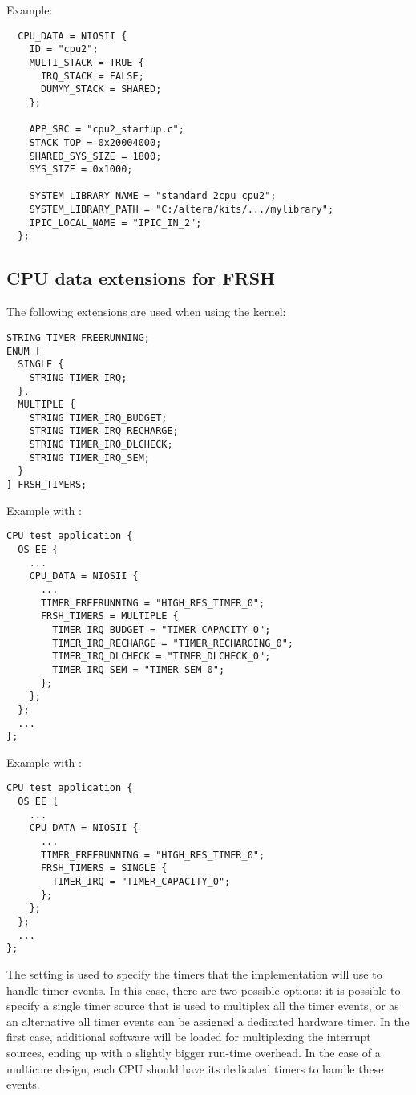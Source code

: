Example:

\begin{lstlisting}
  CPU_DATA = NIOSII {
    ID = "cpu2";
    MULTI_STACK = TRUE {
      IRQ_STACK = FALSE;
      DUMMY_STACK = SHARED;
    };

    APP_SRC = "cpu2_startup.c";
    STACK_TOP = 0x20004000;
    SHARED_SYS_SIZE = 1800;
    SYS_SIZE = 0x1000; 

    SYSTEM_LIBRARY_NAME = "standard_2cpu_cpu2";
    SYSTEM_LIBRARY_PATH = "C:/altera/kits/.../mylibrary";
    IPIC_LOCAL_NAME = "IPIC_IN_2";
  };
\end{lstlisting}

\subsection{CPU data extensions for FRSH}

The following extensions are used when using the  kernel:

\begin{lstlisting}
STRING TIMER_FREERUNNING;
ENUM [
  SINGLE {
    STRING TIMER_IRQ;
  },
  MULTIPLE {
    STRING TIMER_IRQ_BUDGET;
    STRING TIMER_IRQ_RECHARGE;
    STRING TIMER_IRQ_DLCHECK;
    STRING TIMER_IRQ_SEM;
  }
] FRSH_TIMERS;
\end{lstlisting}

Example with :

\begin{lstlisting}
CPU test_application {
  OS EE {
    ...
    CPU_DATA = NIOSII {
      ...
      TIMER_FREERUNNING = "HIGH_RES_TIMER_0";
      FRSH_TIMERS = MULTIPLE {
        TIMER_IRQ_BUDGET = "TIMER_CAPACITY_0";
        TIMER_IRQ_RECHARGE = "TIMER_RECHARGING_0";
        TIMER_IRQ_DLCHECK = "TIMER_DLCHECK_0";
        TIMER_IRQ_SEM = "TIMER_SEM_0";
      };
    };
  };
  ...
};
\end{lstlisting}

Example with :

\begin{lstlisting}
CPU test_application {
  OS EE {
    ...
    CPU_DATA = NIOSII {
      ...
      TIMER_FREERUNNING = "HIGH_RES_TIMER_0";
      FRSH_TIMERS = SINGLE {
        TIMER_IRQ = "TIMER_CAPACITY_0";
      };
    };
  };
  ...
};
\end{lstlisting}

The setting is used to specify the timers that the 
implementation will use to handle timer events. In this case, there
are two possible options: it is possible to specify a single timer
source that is used to multiplex all the timer events, or as an
alternative all timer events can be assigned a dedicated hardware
timer. In the first case, additional software will be loaded for
multiplexing the interrupt sources, ending up with a slightly bigger
run-time overhead. In the case of a multicore design, each CPU should have its dedicated timers to handle these events.

